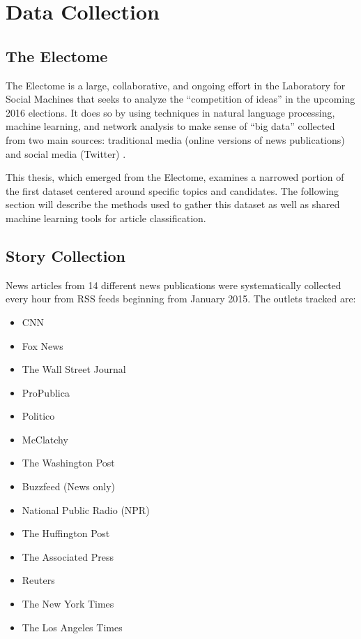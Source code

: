 \chapter{Data Collection}

\section{The Electome}

The Electome is a large, collaborative, and ongoing effort in the Laboratory for Social Machines that seeks to analyze the ``competition of ideas'' in the upcoming 2016 elections. It does so by using techniques in natural language processing, machine learning, and network analysis to make sense of ``big data'' collected from two main sources: traditional media (online versions of news publications) and social media (Twitter) \cite{vvr_electome2016}. 

This thesis, which emerged from the Electome, examines a narrowed portion of the first dataset centered around specific topics and candidates. The following section will describe the methods used to gather this dataset as well as shared machine learning tools for article classification.

\section{Story Collection} 

News articles from 14 different news publications were systematically collected every hour from RSS feeds beginning from January 2015. The outlets tracked are:
 

\begin{multicols}{2}
    \begin{itemize}
    \itemsep-1em 
      \item CNN
      \item Fox News
      \item The Wall Street Journal
      \item ProPublica
      \item Politico
      \item McClatchy
      \item The Washington Post
      \item Buzzfeed (News only)
      \item National Public Radio (NPR)
      \item The Huffington Post
      \item The Associated Press
      \item Reuters
      \item The New York Times
      \item The Los Angeles Times
    \end{itemize}
\end{multicols}

